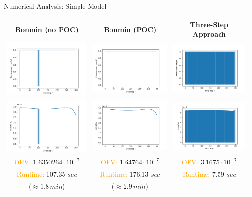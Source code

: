 \documentclass[8pt]{beamer}
\begin{document}
\begin{frame}{Numerical Analysis: Simple Model}
\begin{tabular}{ccc} \hline
Bonmin (no POC)& Bonmin (POC) & Three-Step Approach \\\hline
 \includegraphics[width=.32\textwidth]{images/bonmin_control_beta.png} &   \includegraphics[width=.32\textwidth]{images/BONMINConf.png} & \includegraphics[width=.32\textwidth]{images/POCConf.png}  \\ 
  \includegraphics[width=.32\textwidth]{images/bonmin_control_u.png} &   \includegraphics[width=.32\textwidth]{images/BONMINControl_u.png} & \includegraphics[width=.32\textwidth]{images/POCControl_u.png}  \\ 
\textcolor{orange}{OFV:} $1.6350264 \cdot 10^{-7}$ & \textcolor{orange}{OFV:}  $1.64764 \cdot 10^{-7}$  & \textcolor{orange}{OFV:}  $3.1675 \cdot 10^{-7}$ \\ 
\textcolor{orange}{Runtime:} 107.35 $sec$ & \textcolor{orange}{Runtime:}  176.13 $sec$ & \textcolor{orange}{Runtime:}  7.59 $sec$ \\
($\approx 1.8 \, min$) & ($\approx 2.9 \, min$) &
\end{tabular} 
\end{frame}
\end{document}
